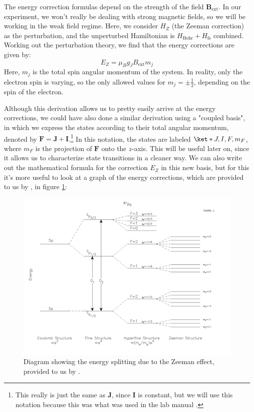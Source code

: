 \documentclass[10pt]{article}
\begin{document}
	The energy correction formulas depend on the strength of the field \(
	\mathbf{B}_\text{ext} \). In our experiment, we won't really be dealing with
	strong magnetic fields, so we will be working in the weak field regime. Here, we
	consider \( H_Z \) (the Zeeman correction) as the perturbation, and the
	unperturbed Hamiltonian is \( H_\text{Bohr} + H_\text{fs} \) combined. Working
	out the perturbation theory, we find that the energy corrections are given by:
	\[
		E_Z = \mu_B g_J B_\text{ext} m_j
	\]
	Here, \( m_j \) is the total spin angular momentum of the system. In reality,
	only the electron spin is varying, so the only allowed values for \( m_j = \pm
	\frac{1}{2} \), depending on the spin of the electron.

	Although this derivation allows us to pretty easily arrive at the energy
	corrections, we could have also done a similar derivation using a "coupled
	basis", in which we express the states according to their total angular momentum,
	denoted by \( \mathbf{F} = \mathbf{J} + \mathbf{I} \).\footnote{This really is
		just the same as \( \mathbf{J} \), since \( \mathbf{I} \) is constant, but we
	will use this notation because this was what was used in the lab manual
	\cite{lab-manual}.}
	In this notation, the
	states are labeled \( \ket*{J, I, F, m_F} \), where \( m_F \) is the projection
	of \( \mathbf{F} \) onto the \( z \)-axis. This will be useful later on, since it
	allows us to characterize state transitions in a cleaner way. We can also write
	out the mathematical formula for the correction \( E_Z \) in this new basis, but
	for this it's more useful to look at a graph of the energy corrections, which are
	provided to us by \cite{ouelletEnergyLevelsRb2010}, in figure \ref{zeeman}:

	\begin{figure}
		\centering
		\includegraphics[scale=0.5]{images/zeeman.png}	
		\caption{Diagram showing the energy splitting due to the Zeeman effect,
		provided to us by \cite{ouelletEnergyLevelsRb2010}.} 
		\label{zeeman}
	\end{figure}
\end{document}
